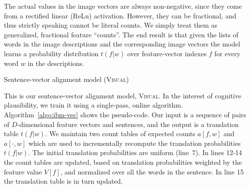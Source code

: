 The actual values in the image vectors are always non-negative, since
they come from a rectified linear (ReLu) activation. However, they can
be fractional, and thus strictly speaking cannot be literal counts. We
simply treat them as generalized, fractional feature ``counts''.  The
end result is that given the lists of words in the image descriptions
and the corresponding image vectors the model learns a probability
distribution $t(f|w)$ over feature-vector indexes $f$ for every word
$w$ in the descriptions.


\begin{algorithm}
\caption{Sentence-vector alignment model
  (\textsc{Visual})}
\label{algo:ibm-vec}
\begin{algorithmic}[1]
 
 
         
            
\EndFor
\EndFor
\EndFor

\end{algorithmic}
\end{algorithm}

This is our sentence-vector alignment model, \textsc{Visual}. In the
interest of cognitive plausibility, we train it using a single-pass,
online algorithm. Algorithm~\ref{algo:ibm-vec} shows the pseudo-code.
Our input is a sequence of pairs of $D$-dimensional feature vectors
and sentences, and the output is a translation table $t(f|w)$. We
maintain two count tables of expected counts $a[f,w]$ and $a[\cdot,w]$
which are used to incrementally recompute the translation
probabilities $t(f|w)$. The initial translation probabilities are
uniform \mbox{(line 7)}. In lines 12-14 the count tables are updated, based
on translation probabilities weighted by the feature value $V[f]$, and
normalized over all the words in the sentence. In line 15 the
translation table is in turn updated.

